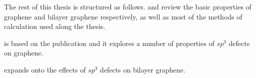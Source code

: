 




%

\bigskip
The rest of this thesis is structured as follows.  and  review the basic properties of graphene and bilayer graphene respectively, as well as most of the methods of calculation used along the thesis.

 is based on the publication  and it explores a number of properties of $sp^3$ defects on graphene.

 expands onto the effects of $sp^3$ defects on bilayer graphene.

